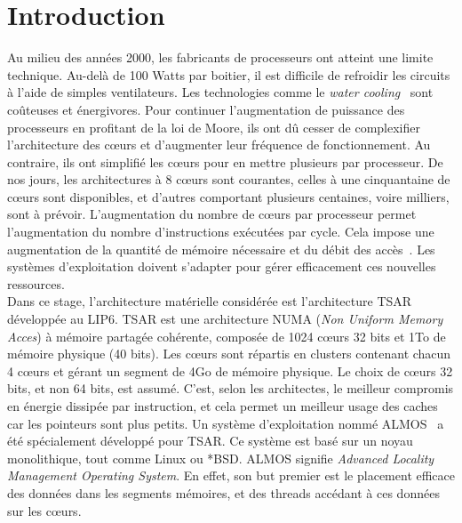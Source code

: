 \chapter{Introduction}

  \hspace{1cm}Au milieu des années 2000, les fabricants de processeurs ont
  atteint une limite technique.  Au-delà de 100 Watts par boitier, il est
  difficile de refroidir les circuits à l'aide de simples ventilateurs. Les
  technologies comme le \textit{water cooling}~\citep{googleXXXXdatacenters}
  sont coûteuses et énergivores.  Pour continuer l'augmentation de puissance des
  processeurs en profitant de la loi de Moore, ils ont dû cesser de complexifier
  l'architecture des c\oe urs et d'augmenter leur fréquence de
  fonctionnement. Au contraire, ils ont simplifié les c\oe urs pour en mettre
  plusieurs par processeur.  De nos jours, les architectures à 8 c\oe urs sont
  courantes, celles à une cinquantaine de c\oe urs sont disponibles, et d'autres
  comportant plusieurs centaines, voire milliers, sont à prévoir.
  L'augmentation du nombre de c\oe urs par processeur permet l'augmentation du
  nombre d'instructions exécutées par cycle.  Cela impose une augmentation de la
  quantité de mémoire nécessaire et du débit des accès~\citep{hp2012z820,
    puget2013z9pe}. Les systèmes d'exploitation doivent s'adapter pour gérer
  efficacement ces nouvelles ressources.\\

  \hspace{1cm}Dans ce stage, l'architecture matérielle considérée est
  l'architecture TSAR~\citep{greiner2009tsar} développée au LIP6. TSAR est une
  architecture NUMA (\textit{Non Uniform Memory Acces}) à mémoire partagée
  cohérente, composée de 1024 c\oe urs 32 bits et 1To de mémoire physique (40
  bits).  Les c\oe urs sont répartis en clusters contenant chacun 4 c\oe urs et
  gérant un segment de 4Go de mémoire physique. Le choix de c\oe urs 32 bits, et
  non 64 bits, est assumé. C'est, selon les architectes, le meilleur compromis
  en énergie dissipée par instruction, et cela permet un meilleur usage des
  caches car les pointeurs sont plus petits.  Un système d'exploitation nommé
  ALMOS~\citep{almaless2011almos} a été spécialement développé pour TSAR. Ce
  système est basé sur un noyau monolithique, tout comme Linux ou *BSD. ALMOS
  signifie \textit{Advanced Locality Management Operating System}. En effet, son
  but premier est le placement efficace des données dans les segments mémoires,
  et des threads accédant à ces données sur les c\oe urs.\\

